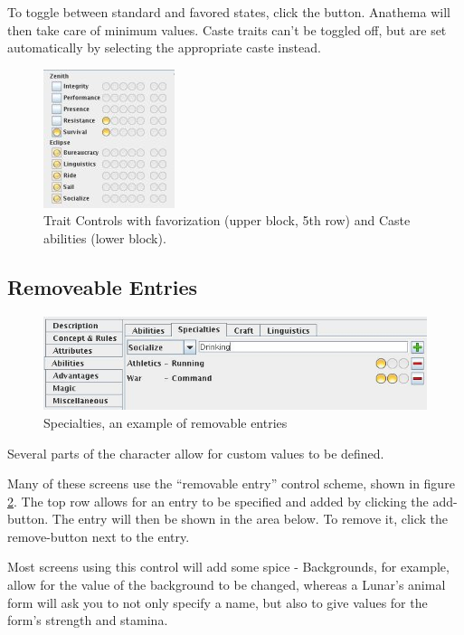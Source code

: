 To toggle between standard and favored states, click the button. Anathema will then take care of minimum values. Caste traits can't be toggled off, but are set automatically by selecting the appropriate caste instead.

\begin{figure}
	\centering
		\includegraphics{images/TraitControl.jpg}
	\caption{Trait Controls with favorization (upper block, 5th row) and Caste abilities (lower block).}
	\label{fig:TraitControl}
\end{figure}

\subsection{Removeable Entries}

\begin{figure}
	\centering
		\includegraphics[width=1.00\textwidth]{images/RemovableEntries.jpg}
	\caption{Specialties, an example of removable entries}
	\label{fig:RemovableEntries}
\end{figure}

Several parts of the character allow for custom values to be defined.

Many of these screens use the "`removable entry"' control scheme, shown in figure \ref{fig:RemovableEntries}.
The top row allows for an entry to be specified and added by clicking the add-button. The entry will then be shown in the area below. To remove it, click the remove-button next to the entry.

Most screens using this control will add some spice - Backgrounds, for example, allow for the value of the background to be changed, whereas a Lunar's animal form will ask you to not only specify a name, but also to give values for the form's strength and stamina.

